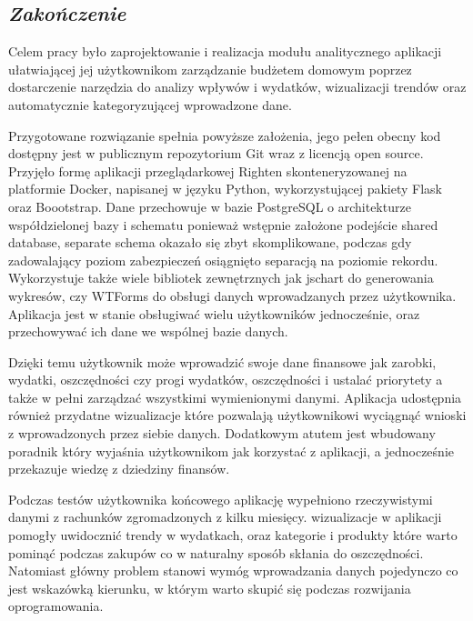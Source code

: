 \documentclass[a4paper, 10pt, twoside, openright]{report}
\newcommand{\customstylechapter}[1]{\large{\textit{#1}}}
\begin{document}
\begin{large}
\chapter{\customstylechapter{Zakończenie}}
{Celem pracy było zaprojektowanie i realizacja modułu analitycznego aplikacji 
ułatwiającej jej użytkownikom zarządzanie budżetem domowym poprzez dostarczenie
narzędzia do analizy wpływów i wydatków, wizualizacji trendów oraz automatycznie 
kategoryzującej wprowadzone dane.}

{Przygotowane rozwiązanie spełnia powyższe założenia, jego pełen obecny kod 
dostępny jest w publicznym repozytorium Git \cite{GITRighten} wraz z licencją 
open source. Przyjęło formę aplikacji przeglądarkowej Righten skonteneryzowanej 
na platformie Docker, napisanej w języku Python, wykorzystującej pakiety Flask 
oraz Boootstrap. Dane przechowuje w bazie PostgreSQL o architekturze 
współdzielonej bazy i schematu \cite{multitenant} ponieważ wstępnie założone 
podejście shared database, separate schema okazało się zbyt skomplikowane, 
podczas gdy zadowalający poziom zabezpieczeń osiągnięto separacją na poziomie 
rekordu. Wykorzystuje także wiele bibliotek zewnętrznych jak jschart do 
generowania wykresów, czy WTForms do obsługi danych wprowadzanych przez 
użytkownika. Aplikacja jest w stanie obsługiwać wielu użytkowników jednocześnie,
 oraz przechowywać ich dane we wspólnej bazie danych.}

{Dzięki temu użytkownik może wprowadzić swoje dane finansowe jak zarobki, 
wydatki, oszczędności czy progi wydatków, oszczędności i ustalać priorytety a 
także w pełni zarządzać wszystkimi wymienionymi danymi. Aplikacja udostępnia 
również przydatne wizualizacje które pozwalają użytkownikowi wyciągnąć wnioski 
z wprowadzonych przez siebie danych. Dodatkowym atutem jest wbudowany poradnik 
który wyjaśnia użytkownikom jak korzystać z aplikacji, a jednocześnie przekazuje
 wiedzę z dziedziny finansów.}

{Podczas testów użytkownika końcowego aplikację wypełniono rzeczywistymi danymi 
z rachunków zgromadzonych z kilku miesięcy. wizualizacje w aplikacji 
pomogły uwidocznić trendy w wydatkach, oraz kategorie i produkty które warto 
pominąć podczas zakupów co w naturalny sposób skłania do oszczędności. Natomiast
 główny problem stanowi wymóg wprowadzania danych pojedynczo co jest wskazówką 
kierunku, w którym warto skupić się podczas rozwijania oprogramowania.}


\end{large}
\end{document}
